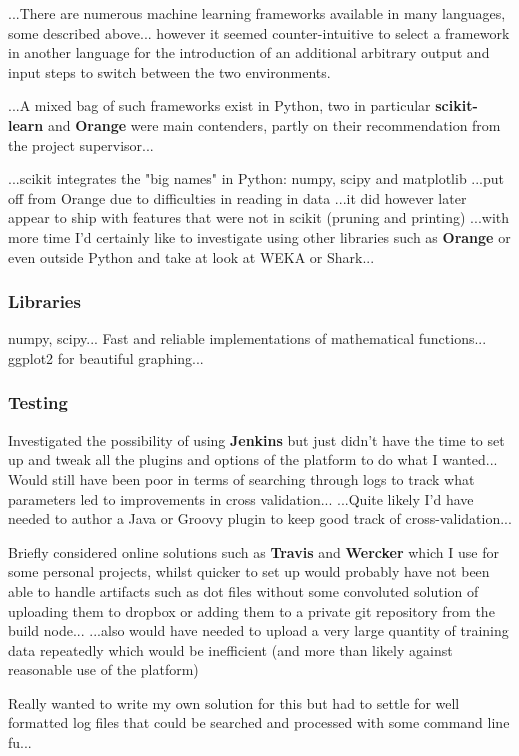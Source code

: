 ...There are numerous machine learning frameworks available in many languages,
some described above... however it seemed counter-intuitive to select a
framework in another language for the introduction of an additional arbitrary
output and input steps to switch between the two environments.

...A mixed bag of such frameworks exist in Python, two in particular
\textbf{scikit-learn} and \textbf{Orange} were main contenders, partly on their
recommendation from the project supervisor...

...scikit integrates the "big names" in Python: numpy, scipy and matplotlib
...put off from Orange due to difficulties in reading in data ...it did however
later appear to ship with features that were not in scikit (pruning and
printing) ...with more time I'd certainly like to investigate using other
libraries such as \textbf{Orange} or even outside Python and take at look at WEKA
or Shark...

\subsubsection{Libraries}
numpy, scipy... Fast and reliable implementations of
mathematical functions...  ggplot2 for beautiful graphing...

\subsubsection{Testing}
Investigated the possibility of using \textbf{Jenkins}
but just didn't have the time to set up and tweak all the plugins and options of
the platform to do what I wanted... Would still have been poor in terms of
searching through logs to track what parameters led to improvements in cross
validation... ...Quite likely I'd have needed to author a Java or Groovy plugin
to keep good track of cross-validation...

Briefly considered online solutions such as \textbf{Travis} and \textbf{Wercker}
which I use for some personal projects, whilst quicker to set up would probably
have not been able to handle artifacts such as dot files without some convoluted
solution of uploading them to dropbox or adding them to a private git repository
from the build node...  ...also would have needed to upload a very large
quantity of training data repeatedly which would be inefficient (and more than
likely against reasonable use of the platform)

Really wanted to write my own solution for this but had to settle for well
formatted log files that could be searched and processed with some command line
fu...

